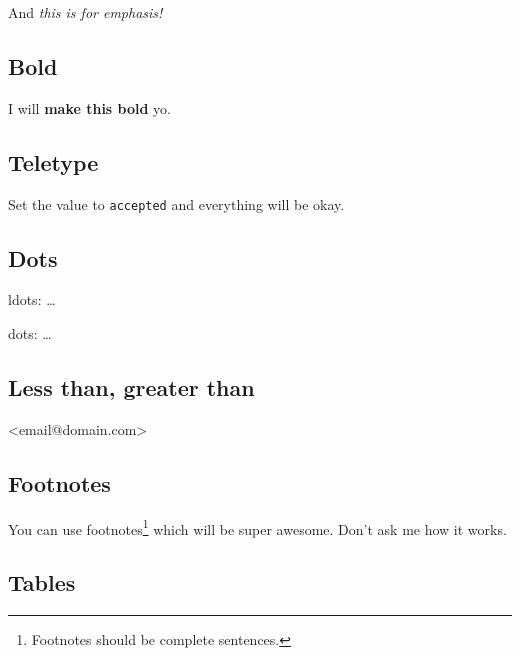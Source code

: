 \documentclass{article}
\begin{document}
And \emph{this is for emphasis!}

\subsection{Bold}

I will \textbf{make this bold} yo.

\subsection{Teletype}

Set the value to \texttt{accepted} and everything will be okay.

\subsection{Dots}

ldots: \ldots

dots: \dots

\subsection{Less than, greater than}

\textless{}email@domain.com\textgreater{}

\subsection{Footnotes}

You can use footnotes\footnote{Footnotes should be complete
  sentences.} which will be super awesome. Don't ask me how it works.

\subsection{Tables}
\end{document}
